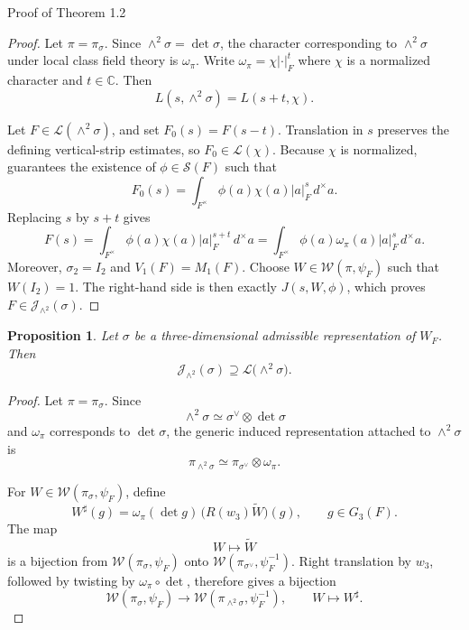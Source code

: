 \documentclass[12pt,reqno]{amsart}
\numberwithin{equation}{section}%
\numberwithin{equation}{subsection}
\newtheorem{prop}[equation]{Proposition}
\theoremstyle{definition}
\theoremstyle{remark}
\begin{document}
\begin{section}{Proof of Theorem 1.2}
\begin{proof}
Let $\pi=\pi_\sigma$. Since $\wedge^2\sigma=\det\sigma$, the character corresponding to $\wedge^2\sigma$ under local class field theory is $\omega_\pi$. Write $\omega_\pi = \chi |\cdot|_F^{t}$ where $\chi$ is a normalized character and $t\in\mathbb{C}$. Then
\[
L(s,\wedge^2\sigma) = L(s+t,\chi).
\]

Let $F \in \mathcal{L}(\wedge^2\sigma)$, and set $F_0(s) = F(s-t)$. Translation in $s$ preserves the defining vertical-strip estimates, so $F_0 \in \mathcal{L}(\chi)$. Because $\chi$ is normalized, \cite[Lemma~12.3]{Jac2009} guarantees the existence of $\phi \in \mathcal{S}(F)$ such that
\[
F_0(s)
=
\int_{F^\times}
\phi(a)\chi(a)|a|_F^s\,d^\times a.
\]
Replacing $s$ by $s+t$ gives
\[
F(s)
=
\int_{F^\times}
\phi(a)\chi(a)|a|_F^{s+t}\,d^\times a
=
\int_{F^\times}
\phi(a)\omega_\pi(a)|a|_F^s\,d^\times a.
\]
Moreover, $\sigma_2=I_2$ and $V_1(F)=M_1(F)$. Choose $W \in \mathcal{W}(\pi,\psi_F)$ such that $W(I_2)=1$. The right-hand side is then exactly $J(s,W,\phi)$, which proves $F \in \mathcal{J}_{\wedge^2}(\sigma)$.
\end{proof}

\begin{prop}
\label{prop:exterior-square-rank-three}
Let \(\sigma\) be a three-dimensional admissible representation of
\(W_F\). Then
\[
\mathcal{J}_{\wedge^2}(\sigma)
\supseteq
\mathcal{L}\bigl(\wedge^2\sigma\bigr).
\]
\end{prop}

\begin{proof}
Let \(\pi=\pi_\sigma\). Since
\[
\wedge^2\sigma
\simeq
\sigma^\vee\otimes\det\sigma
\]
and \(\omega_\pi\) corresponds to \(\det\sigma\), the generic induced
representation attached to \(\wedge^2\sigma\) is
\[
\pi_{\wedge^2\sigma}
\simeq
\pi_{\sigma^\vee}\otimes\omega_\pi.
\]

For \(W\in\mathcal{W}(\pi_\sigma,\psi_F)\), define
\[
W^\sharp(g)
=
\omega_\pi(\det g)\,
\bigl(R(w_3)\widetilde W\bigr)(g),
\qquad g\in G_3(F).
\]
The map
\[
W\longmapsto\widetilde W
\]
is a bijection from
\(\mathcal{W}(\pi_\sigma,\psi_F)\) onto
\(\mathcal{W}(\pi_{\sigma^\vee},\psi_F^{-1})\).
Right translation by \(w_3\), followed by twisting by
\(\omega_\pi\circ\det\), therefore gives a bijection
\[
\mathcal{W}(\pi_\sigma,\psi_F)
\longrightarrow
\mathcal{W}(\pi_{\wedge^2\sigma},\psi_F^{-1}),
\qquad
W\longmapsto W^\sharp.
\]


\end{proof}
\end{section}
\end{document}
